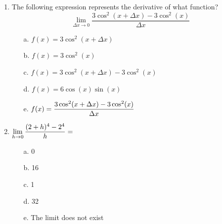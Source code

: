 \documentclass[12pt]{report}
\begin{document}
\begin{enumerate}
\item  The following expression represents the derivative of what function?\vspace{0.25cm}
\[
\lim_{\Delta x \to 0}\frac{3\cos^2(x+\Delta x)-3\cos^2(x)}{\Delta x}
\]\vspace{0.25cm}
\begin{enumerate}
\item [a.] $f(x) = 3\cos^2(x+\Delta x)$ \vspace{0.2cm}
\item [b.] $f(x) = 3\cos^2(x)$ \vspace{0.2cm}
\item [c.] $f(x) = 3\cos^2(x+\Delta x)-3\cos^2(x)$ \vspace{0.2cm}
\item [d.] $f(x) = 6\cos(x)\sin(x)$ \vspace{0.2cm}
\item [e.] $\displaystyle f(x) = \frac{3\cos^2(x+\Delta x)-3\cos^2(x)}{\Delta x}$
\end{enumerate}

\item $\displaystyle \lim_{h \to 0} \frac{(2+h)^4-2^4}{h}=$ \vspace{0.25cm}
\begin{enumerate}
\item [a.] 0 \vspace{0.2cm}
\item [b.] 16 \vspace{0.2cm}
\item [c.] 1 \vspace{0.2cm}
\item [d.] 32 \vspace{0.2cm}
\item [e.] The limit does not exist
\end{enumerate}

\end{enumerate}
\end{document}
